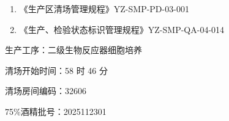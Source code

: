 \documentclass[UTF8,10pt,a4paper,fontset=fandol]{ctexart}
\newcommand{\fieldvalue}[1]{#1}
\newcommand{\handwritten}[1]{#1}
\begin{document}
\begin{enumerate}
\item 《生产区清场管理规程》\hfill YZ-SMP-PD-03-001
\item 《生产、检验状态标识管理规程》\hfill YZ-SMP-QA-04-014
\end{enumerate}

生产工序：二级生物反应器细胞培养

\noindent
清场开始时间：\fieldvalue{\handwritten{58}} 时 \fieldvalue{\handwritten{46}} 分

\noindent
清场房间编码：\fieldvalue{\handwritten{32606}}

\noindent
75\%酒精批号：\fieldvalue{\handwritten{2025112301}}
\end{document}
